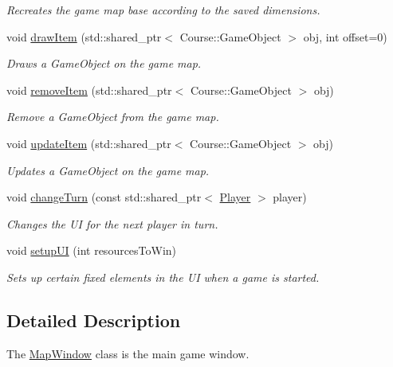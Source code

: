 \begin{DoxyCompactItemize}
\begin{DoxyCompactList}\small\item\em Recreates the game map base according to the saved dimensions. \end{DoxyCompactList}\item 
void \hyperlink{classMapWindow_a84951fe90f52cd94b73fdc7b0a4e4899}{draw\-Item} (std\-::shared\-\_\-ptr$<$ Course\-::\-Game\-Object $>$ obj, int offset=0)
\begin{DoxyCompactList}\small\item\em Draws a Game\-Object on the game map. \end{DoxyCompactList}\item 
void \hyperlink{classMapWindow_a88384cf195d4cec6e4779d2f6b83b675}{remove\-Item} (std\-::shared\-\_\-ptr$<$ Course\-::\-Game\-Object $>$ obj)
\begin{DoxyCompactList}\small\item\em Remove a Game\-Object from the game map. \end{DoxyCompactList}\item 
void \hyperlink{classMapWindow_a40b4e18c08d80bafcf006fafe16d75c2}{update\-Item} (std\-::shared\-\_\-ptr$<$ Course\-::\-Game\-Object $>$ obj)
\begin{DoxyCompactList}\small\item\em Updates a Game\-Object on the game map. \end{DoxyCompactList}\item 
void \hyperlink{classMapWindow_ab834c94bbb2a4e209eda3c7f283e2cd2}{change\-Turn} (const std\-::shared\-\_\-ptr$<$ \hyperlink{classPlayer}{Player} $>$ player)
\begin{DoxyCompactList}\small\item\em Changes the U\-I for the next player in turn. \end{DoxyCompactList}\item 
void \hyperlink{classMapWindow_aa0ab33facccac2bdfafcc68468725f55}{setup\-U\-I} (int resources\-To\-Win)
\begin{DoxyCompactList}\small\item\em Sets up certain fixed elements in the U\-I when a game is started. \end{DoxyCompactList}\end{DoxyCompactItemize}


\subsection{Detailed Description}
The \hyperlink{classMapWindow}{Map\-Window} class is the main game window. 

